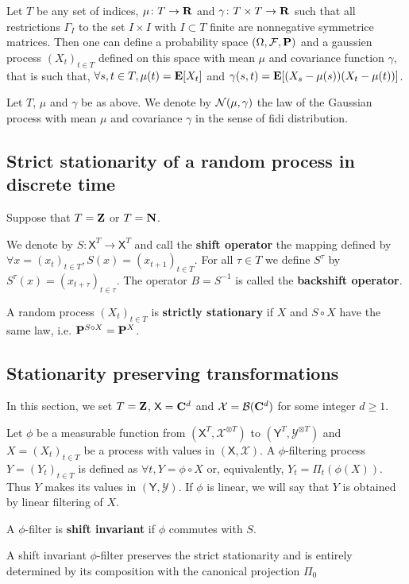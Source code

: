 	\begin{thm}
		Let $T$ be any set of indices, $\mu \colon T \to \mathbf{R}$ and $\gamma \colon T \times T \to \mathbf{R}$ such that all restrictions $\Gamma_I$ to the set $I \times I$ with $I \subset T$ finite are nonnegative symmetrice matrices.
		Then one can define a probability space $(\Omega, \mathcal{F}, \mathbf{P})$ and a gaussien process $(X_t)_{t \in T}$ defined on this space with mean $\mu$ and covariance function $\gamma$, that is such that, $\forall s, t \in T, \mu(t) = \mathbf{E}[X_t]$ and $\gamma(s,t) = \mathbf{E}[(X_s - \mu(s))(X_t - \mu(t))]$.
	\end{thm}

	\begin{defn}
		Let $T$, $\mu$ and $\gamma$ be as above.
		We denote by $\mathcal{N}(\mu,\gamma)$ the law of the Gaussian process with mean $\mu$ and covariance $\gamma$ in the sense of fidi distribution.
	\end{defn}


\subsection{Strict stationarity of a random process in discrete time}

	Suppose that $T = \mathbf{Z}$ or $T = \mathbf{N}$.

	\begin{defn}
		We denote by $S \colon \mathsf{X}^T \to \mathsf{X}^T$ and call the \textbf{shift operator} the mapping defined by $\forall x = (x_t)_{t \in T}, S(x) = (x_{t + 1})_{t \in T}$.
		For all $\tau \in T$ we define $S^\tau$ by $S^\tau (x) = (x_{t + \tau})_{t \in \tau}$.
		The operator $B = S^{-1}$ is called the \textbf{backshift operator}.
	\end{defn}

	\begin{defn}
		A random process $(X_t)_{t \in T}$ is \textbf{strictly stationary} if $X$ and $S \circ X$ have the same law, i.e. $\mathbf{P}^{S \circ X} = \mathbf{P}^X$.
	\end{defn}

\subsection{Stationarity preserving transformations}

	In this section, we set $T = \mathbf{Z}$, $\mathsf{X} = \mathbf{C}^d$ and $\mathcal{X} = \mathcal{B}(\mathbf{C}^d)$ for some integer $d \geq 1$.
	
	\begin{defn}
		Let $\phi$ be a measurable function from $\left( \mathsf{X}^T, \mathcal{X}^{\otimes T} \right)$ to $\left( \mathsf{Y}^T, \mathcal{Y}^{\otimes T} \right)$ and $X = (X_t)_{t \in T}$ be a process with values in $(\mathsf{X},\mathcal{X})$.
		A $\phi$-filtering process $Y = (Y_t)_{t \in T}$ is defined as $\forall t, Y = \phi \circ X$ or, equivalently, $Y_t = \Pi_t(\phi(X))$.
		Thus $Y$ makes its values in $(\mathsf{Y}, \mathcal{Y})$.
		If $\phi$ is linear, we will say that $Y$ is obtained by linear filtering of $X$.
	\end{defn}

	\begin{defn}
		A $\phi$-filter is \textbf{shift invariant} if $\phi$ commutes with $S$.
	\end{defn}

	\begin{rem}
		A shift invariant $\phi$-filter preserves the strict stationarity and is entirely determined by its composition with the canonical projection $\Pi_0$
	\end{rem}

